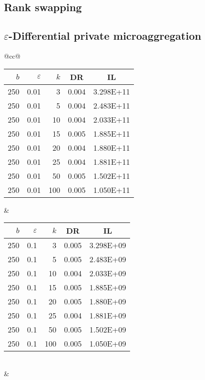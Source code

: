\subsection{Rank swapping}
\label{Benchmarking:Results:RankSwap}

\subsection{$\varepsilon$-Differential private microaggregation}
\label{Benchmarking:Results:DiffPriv}

\begin{table}[H]
	\centering
	\begin{tabular}{@{}cc@{}}
		\begin{tabular}{@{}rrrrr@{}}
			\toprule
			$b$ & $\varepsilon$ & $k$ & \multicolumn{1}{c}{DR} & \multicolumn{1}{c}{IL} \\ \midrule
			250 & 0.01 & 3   & 0.004 & 3.298E+11 \\
			250 & 0.01 & 5   & 0.004 & 2.483E+11 \\
			250 & 0.01 & 10  & 0.004 & 2.033E+11 \\
			250 & 0.01 & 15  & 0.005 & 1.885E+11 \\
			250 & 0.01 & 20  & 0.004 & 1.880E+11 \\
			250 & 0.01 & 25  & 0.004 & 1.881E+11 \\
			250 & 0.01 & 50  & 0.005 & 1.502E+11 \\
			250 & 0.01 & 100 & 0.005 & 1.050E+11 \\ \bottomrule
		\end{tabular}
		&
		\begin{tabular}{@{}rrrrr@{}}
			\toprule
			$b$ & $\varepsilon$ & $k$ & \multicolumn{1}{c}{DR} & \multicolumn{1}{c}{IL} \\ \midrule
			250 & 0.1 & 3   & 0.005 & 3.298E+09 \\
			250 & 0.1 & 5   & 0.005 & 2.483E+09 \\
			250 & 0.1 & 10  & 0.004 & 2.033E+09 \\
			250 & 0.1 & 15  & 0.005 & 1.885E+09 \\
			250 & 0.1 & 20  & 0.005 & 1.880E+09 \\
			250 & 0.1 & 25  & 0.004 & 1.881E+09 \\
			250 & 0.1 & 50  & 0.005 & 1.502E+09 \\
			250 & 0.1 & 100 & 0.005 & 1.050E+09 \\ \bottomrule
		\end{tabular}
		\\ & \\

\end{tabular}
\end{table}
